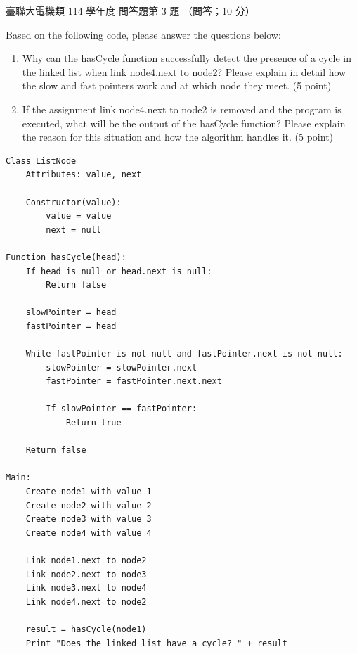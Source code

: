 \begin{pastexam}[label={px:ust-114-ee-ds-27}]{臺聯大電機類 114 學年度 問答題第 3 題}
（問答；10 分）

Based on the following code, please answer the questions below:
\begin{enumerate}[label=(\Alph*)]
\item Why can the hasCycle function successfully detect the presence of a cycle in the linked list
when link node4.next to node2? Please explain in detail how the slow and fast pointers work and at
which node they meet. (5 point)
\item If the assignment link node4.next to node2 is removed and the program is executed, what will be
the output of the hasCycle function? Please explain the reason for this situation and how the
algorithm handles it. (5 point)
\end{enumerate}

\begin{verbatim}
Class ListNode
    Attributes: value, next

    Constructor(value):
        value = value
        next = null

Function hasCycle(head):
    If head is null or head.next is null:
        Return false

    slowPointer = head
    fastPointer = head

    While fastPointer is not null and fastPointer.next is not null:
        slowPointer = slowPointer.next
        fastPointer = fastPointer.next.next

        If slowPointer == fastPointer:
            Return true

    Return false

Main:
    Create node1 with value 1
    Create node2 with value 2
    Create node3 with value 3
    Create node4 with value 4

    Link node1.next to node2
    Link node2.next to node3
    Link node3.next to node4
    Link node4.next to node2

    result = hasCycle(node1)
    Print "Does the linked list have a cycle? " + result
\end{verbatim}
\end{pastexam}


